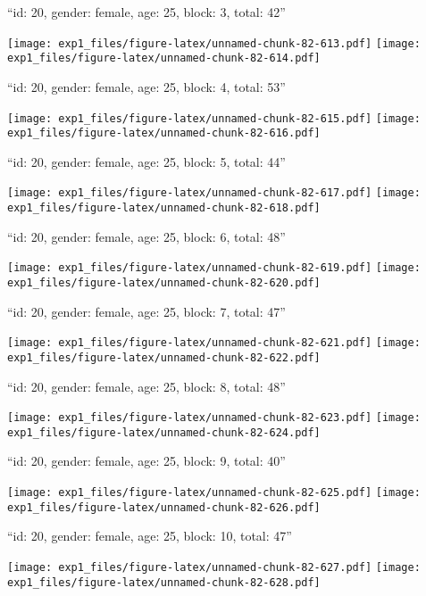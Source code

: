 \documentclass[11pt,,]{article}
\begin{document}
\newpage
[1] 

``id: 20, gender: female, age: 25, block: 3, total: 42''

\texttt{[image: exp1\_files/figure-latex/unnamed-chunk-82-613.pdf]}
\texttt{[image: exp1\_files/figure-latex/unnamed-chunk-82-614.pdf]}

\newpage
[1] 

``id: 20, gender: female, age: 25, block: 4, total: 53''

\texttt{[image: exp1\_files/figure-latex/unnamed-chunk-82-615.pdf]}
\texttt{[image: exp1\_files/figure-latex/unnamed-chunk-82-616.pdf]}

\newpage
[1] 

``id: 20, gender: female, age: 25, block: 5, total: 44''

\texttt{[image: exp1\_files/figure-latex/unnamed-chunk-82-617.pdf]}
\texttt{[image: exp1\_files/figure-latex/unnamed-chunk-82-618.pdf]}

\newpage
[1] 

``id: 20, gender: female, age: 25, block: 6, total: 48''

\texttt{[image: exp1\_files/figure-latex/unnamed-chunk-82-619.pdf]}
\texttt{[image: exp1\_files/figure-latex/unnamed-chunk-82-620.pdf]}

\newpage
[1] 

``id: 20, gender: female, age: 25, block: 7, total: 47''

\texttt{[image: exp1\_files/figure-latex/unnamed-chunk-82-621.pdf]}
\texttt{[image: exp1\_files/figure-latex/unnamed-chunk-82-622.pdf]}

\newpage
[1] 

``id: 20, gender: female, age: 25, block: 8, total: 48''

\texttt{[image: exp1\_files/figure-latex/unnamed-chunk-82-623.pdf]}
\texttt{[image: exp1\_files/figure-latex/unnamed-chunk-82-624.pdf]}

\newpage
[1] 

``id: 20, gender: female, age: 25, block: 9, total: 40''

\texttt{[image: exp1\_files/figure-latex/unnamed-chunk-82-625.pdf]}
\texttt{[image: exp1\_files/figure-latex/unnamed-chunk-82-626.pdf]}

\newpage
[1] 

``id: 20, gender: female, age: 25, block: 10, total: 47''

\texttt{[image: exp1\_files/figure-latex/unnamed-chunk-82-627.pdf]}
\texttt{[image: exp1\_files/figure-latex/unnamed-chunk-82-628.pdf]}
\end{document}
